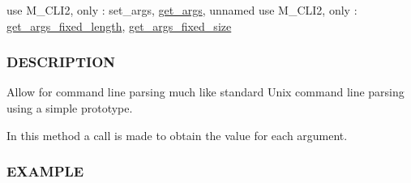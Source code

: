 use M\+\_\+\+C\+L\+I2, only \+: set\+\_\+args, \mbox{\hyperlink{interfacem__cli2_1_1get__args}{get\+\_\+args}}, unnamed use M\+\_\+\+C\+L\+I2, only \+: \mbox{\hyperlink{interfacem__cli2_1_1get__args__fixed__length}{get\+\_\+args\+\_\+fixed\+\_\+length}}, \mbox{\hyperlink{interfacem__cli2_1_1get__args__fixed__size}{get\+\_\+args\+\_\+fixed\+\_\+size}}

\subsubsection*{D\+E\+S\+C\+R\+I\+P\+T\+I\+ON}

Allow for command line parsing much like standard Unix command line parsing using a simple prototype.

In this method a call is made to obtain the value for each argument.

\subsubsection*{E\+X\+A\+M\+P\+LE}

